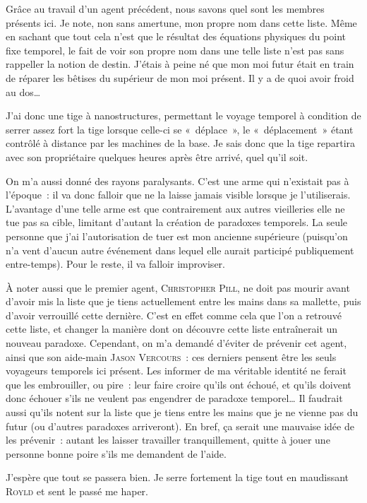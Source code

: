 {	Grâce au travail d’un agent précédent, nous savons quel sont les membres présents ici.
	Je note, non sans amertune, mon propre nom dans cette liste.
	Même en sachant que tout cela n’est que le résultat des équations physiques du point fixe temporel, le fait de voir son propre nom dans une telle liste n’est pas sans rappeller la notion de destin.
	J’étais à peine né que mon moi futur était en train de réparer les bêtises du supérieur de mon moi présent.
	Il y a de quoi avoir froid au dos…

	J’ai donc une tige à nanostructures, permettant le voyage temporel à condition de serrer assez fort la tige lorsque celle-ci se «~déplace~», le «~déplacement~» étant contrôlé à distance par les machines de la base.
	Je sais donc que la tige repartira avec son propriétaire quelques heures après être arrivé, quel qu’il soit.

	On m’a aussi donné des rayons paralysants.
	C’est une arme qui n’existait pas à l’époque~:  il va donc falloir que ne la laisse jamais visible lorsque je l’utiliserais.
	L’avantage d’une telle arme est que contrairement aux autres vieilleries elle ne tue pas sa cible, limitant d’autant la création de paradoxes temporels.
	La seule personne que j’ai l’autorisation de tuer est mon ancienne supérieure (puisqu’on n’a vent d’aucun autre événement dans lequel elle aurait participé publiquement entre-temps).
	Pour le reste, il va falloir improviser.

	À noter aussi que le premier agent, \textsc{Christopher Pill}, ne doit pas mourir avant d’avoir mis la liste que je tiens actuellement entre les mains dans sa mallette, puis d’avoir verrouillé cette dernière.
	C’est en effet comme cela que l’on a retrouvé cette liste, et changer la manière dont on découvre cette liste entraînerait un nouveau paradoxe.
	Cependant, on m’a demandé d’éviter de prévenir cet agent, ainsi que son aide-main \textsc{Jason Vercours}~:  ces derniers pensent être les seuls voyageurs temporels ici présent.
	Les informer de ma véritable identité ne ferait que les embrouiller, ou pire~:  leur faire croire qu’ils ont échoué, et qu’ils doivent donc échouer s’ils ne veulent pas engendrer de paradoxe temporel…
	Il faudrait aussi qu’ils notent sur la liste que je tiens entre les mains que je ne vienne pas du futur (ou d’autres paradoxes arriveront).
	En bref, ça serait une mauvaise idée de les prévenir~:  autant les laisser travailler tranquillement, quitte à jouer une personne bonne poire s’ils me demandent de l’aide.

	J’espère que tout se passera bien.
	Je serre fortement la tige tout en maudissant \textsc{Royld} et sent le passé me haper.
}

